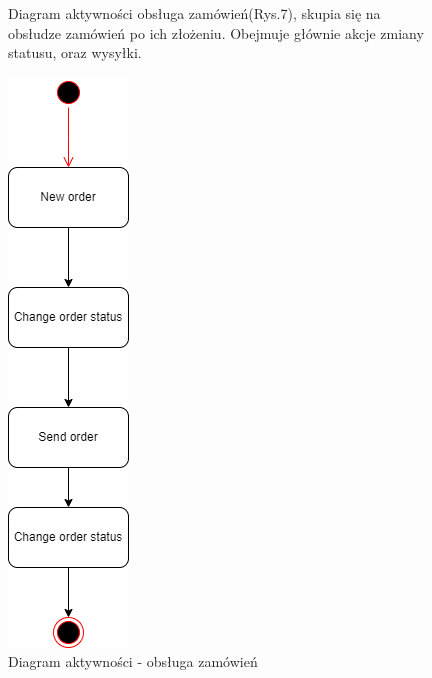 \documentclass[]{article}
\begin{document}
\begin{figure}[ht]
	\begin{minipage}{\textwidth}
		Diagram aktywności obsługa zamówień(Rys.7), skupia się na obsłudze zamówień po ich złożeniu. Obejmuje głównie akcje zmiany statusu, oraz wysyłki.
	\end{minipage}
	\vspace{15pt}

	\centering
	\includegraphics[scale=0.50]{obsl_zam.png}
	\caption{Diagram aktywności - obsługa zamówień}
\end{figure}
\end{document}
